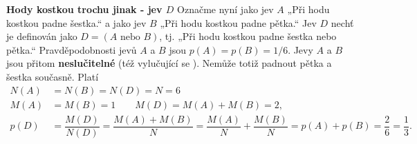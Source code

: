 \wikitextrule
\begin{example}\label{mai:exam052}
  \textbf{Hody kostkou trochu jinak - jev \(D\)}\newline\small
  Označme nyní jako jev \(A\) „Při hodu kostkou padne šestka.“ a jako jev \(B\) „Při hodu kostkou 
  padne pětka.“ Jev \(D\) nechť je definován jako \(D = (A\text{ nebo }B)\), tj. „Při hodu kostkou 
  padne šestka nebo pětka.“ Pravděpodobnosti jevů \(A\) a \(B\) jsou \(p(A) = p(B) = 1/6\). Jevy 
  \(A\) a \(B\) jsou přitom \textbf{neslučitelné} (též vylučující se ). Nemůže
  totiž padnout pětka a šestka současně. Platí
  \begin{align*}
    N(A) &= N(B) = N(D) = N = 6                                                              \\
    M(A) &= M(B) = 1 \qquad M(D) = M(A) + M(B) = 2,                                          \\
    p(D) &= \dfrac{M(D)}{N(D)} = \dfrac{M(A) + M(B)}{N} = \dfrac{M(A)}{N} + \dfrac{M(B)}{N}
          = p(A) + p(B) = \dfrac{2}{6} = \dfrac{1}{3}.
  \end{align*}
  \normalsize
\end{example}